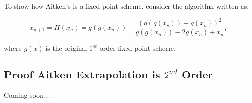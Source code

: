 \documentclass[paper=a4, fontsize=11pt]{scrartcl} %
\numberwithin{equation}{section} %
\numberwithin{figure}{section} %
\numberwithin{table}{section} %
\begin{document}
To show how Aitken's is a fixed point scheme, consider the algorithm written as:

$$x_{n+1} = H(x_n) = g(g(x_n)) - \frac{ ( g(g(x_n)) - g(x_n) )^2   }{ g(g(x_n)) - 2 g(x_n) + x_n   },$$

where $g(x)$ is the original $1^{st}$ order fixed point scheme.

\subsection{Proof Aitken Extrapolation is $2^{nd}$ Order}

Coming soon...
\end{document}
